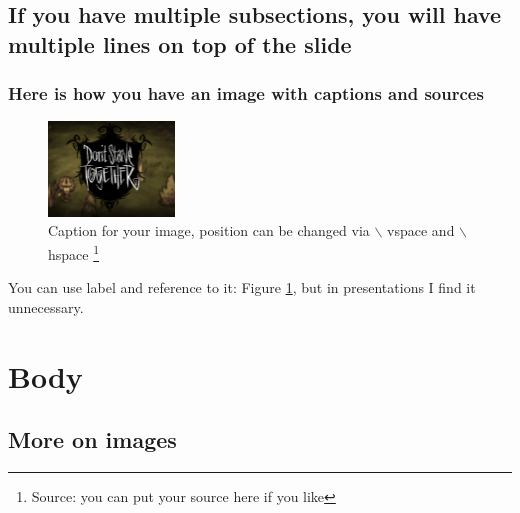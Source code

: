 \documentclass[aspectratio=169]{beamer}
\begin{document}
\subsection{If you have multiple subsections, you will have multiple lines on top of the slide}
\begin{frame}[fragile]
	\frametitle{Here is how you have an image with captions and sources}
	\begin{figure}
	    \centering
	    \includegraphics[width=0.3\textwidth]{images/dst.png}
	    \vspace{-3mm}\caption{Caption for your image, position can be changed via $\backslash$ vspace and $\backslash$ hspace \footnote{\tiny Source: you can put your source here if you like }}
	    \label{dst}
	\end{figure}
	You can use label and reference to it: Figure \ref{dst}, but in presentations I find it unnecessary. 
\end{frame}

\section{Body}
\subsection{More on images}
\end{document}
